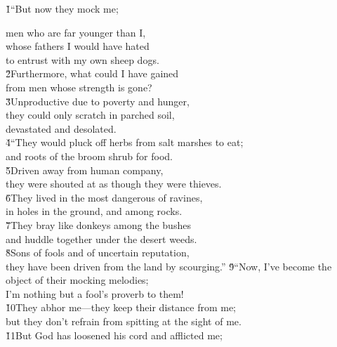 \v{1}``But now they mock me;

\begin{poetry}
\poemll    men who are far younger than I, \\
\poeml whose fathers I would have hated \\
\poemll    to entrust with my own sheep dogs. \\
\poeml \v{2}Furthermore, what could I have gained \\
\poemll    from men whose strength is gone? \\
\poeml \v{3}Unproductive due to poverty and hunger, \\
\poemll    they could only scratch in parched soil, \\
\poemlll       devastated and desolated. \\
\poeml \v{4}``They would pluck off herbs from salt marshes to eat; \\
\poemll    and roots of the broom shrub for food. \\
\poeml \v{5}Driven away from human company, \\
\poemll    they were shouted at as though they were thieves. \\
\poeml \v{6}They lived in the most dangerous of ravines, \\
\poemll    in holes in the ground, and among rocks. \\
\poeml \v{7}They bray like donkeys among the bushes \\
\poemll    and huddle together under the desert weeds. \\
\poeml \v{8}Sons of fools and of uncertain reputation, \\
\poemll    they have been driven from the land by scourging.''
\poeml \v{9}``Now, I've become the object of their mocking melodies; \\
\poemll    I'm nothing but a fool's proverb to them! \\
\poeml \v{10}They abhor me---they keep their distance from me; \\
\poemll    but they don't refrain from spitting at the sight of me. \\
\poeml \v{11}But God has loosened his cord and afflicted me; \\

\end{poetry}
